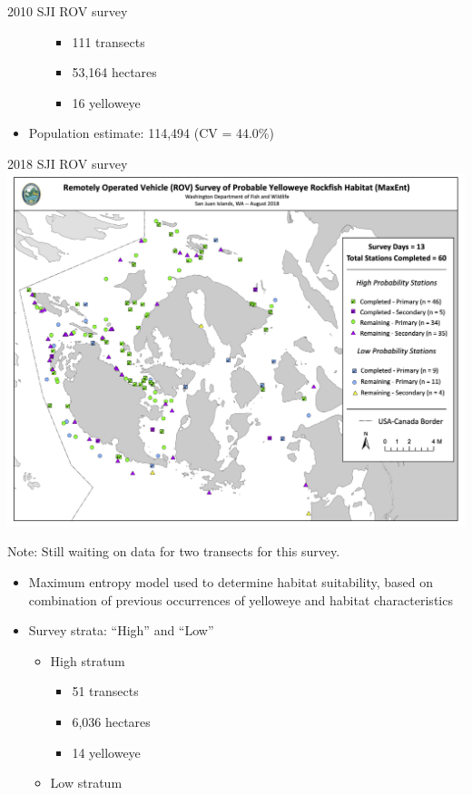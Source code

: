 \documentclass[
  ignorenonframetext,
]{beamer}
\providecommand{\tightlist}{%
  \setlength{\itemsep}{0pt}\setlength{\parskip}{0pt}}
\begin{document}
\begin{frame}{2010 SJI ROV survey}
\begin{itemize}
\begin{itemize}
    \begin{itemize}
    \tightlist
    \item
      111 transects
    \item
      53,164 hectares
    \item
      16 yelloweye
    \end{itemize}
  \end{itemize}
\item
  Population estimate: 114,494 (CV = 44.0\%)
\end{itemize}
\end{frame}

\begin{frame}{2018 SJI ROV survey}
\protect\hypertarget{sji-rov-survey-2}{}
\includegraphics[width=1\textwidth,height=\textheight]{2018_SJI_map.png}

Note: Still waiting on data for two transects for this survey.

\begin{itemize}
\tightlist
\item
  Maximum entropy model used to determine habitat suitability, based on
  combination of previous occurrences of yelloweye and habitat
  characteristics
\item
  Survey strata: ``High'' and ``Low''

  \begin{itemize}
  \tightlist
  \item
    High stratum

    \begin{itemize}
    \tightlist
    \item
      51 transects
    \item
      6,036 hectares
    \item
      14 yelloweye
    \end{itemize}
  \item
    Low stratum


\end{itemize}
\end{itemize}
\end{frame}
\end{document}
